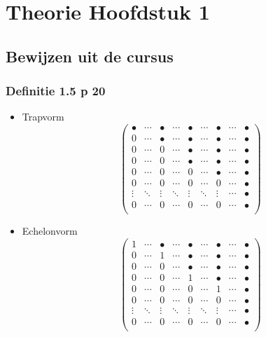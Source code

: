 \documentclass[lineaire_algebra_oplossingen.tex]{subfiles}
\begin{document}
\chapter{Theorie Hoofdstuk 1}
\section{Bewijzen uit de cursus}

\subsection{Definitie 1.5 p 20}
\label{1.5}
\begin{itemize}
\item Trapvorm
\[
\begin{pmatrix}
\bullet & \cdots & \bullet & \cdots & \bullet & \cdots & \bullet & \cdots & \bullet\\
0 & \cdots & \bullet & \cdots & \bullet & \cdots & \bullet & \cdots & \bullet\\
0 & \cdots & 0 & \cdots & \bullet & \cdots & \bullet & \cdots & \bullet\\
0 & \cdots & 0 & \cdots & \bullet & \cdots & \bullet & \cdots & \bullet\\
0 & \cdots & 0 & \cdots & 0 & \cdots & \bullet & \cdots & \bullet\\
0 & \cdots & 0 & \cdots & 0 & \cdots & 0 & \cdots & \bullet\\
\vdots & \ddots & \vdots & \ddots & \vdots & \ddots & \vdots & \cdots & \bullet\\
0 & \cdots & 0 & \cdots & 0 & \cdots & 0 & \cdots & \bullet\\
\end{pmatrix}
\]

\item Echelonvorm
\[
\begin{pmatrix}
1 & \cdots & \bullet & \cdots & \bullet & \cdots & \bullet & \cdots & \bullet\\
0 & \cdots & 1 & \cdots & \bullet & \cdots & \bullet & \cdots & \bullet\\
0 & \cdots & 0 & \cdots & \bullet & \cdots & \bullet & \cdots & \bullet\\
0 & \cdots & 0 & \cdots & 1 & \cdots & \bullet & \cdots & \bullet\\
0 & \cdots & 0 & \cdots & 0 & \cdots & 1 & \cdots & \bullet\\
0 & \cdots & 0 & \cdots & 0 & \cdots & 0 & \cdots & \bullet\\
\vdots & \ddots & \vdots & \ddots & \vdots & \ddots & \vdots & \cdots & \bullet\\
0 & \cdots & 0 & \cdots & 0 & \cdots & 0 & \cdots & \bullet\\
\end{pmatrix}
\]


\end{itemize}
\end{document}
